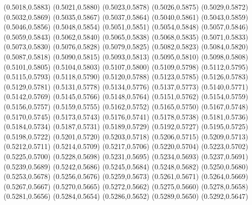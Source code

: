 \PST@Cross(0.5018,0.5883)
\PST@Cross(0.5021,0.5880)
\PST@Cross(0.5023,0.5878)
\PST@Cross(0.5026,0.5875)
\PST@Cross(0.5029,0.5872)
\PST@Cross(0.5032,0.5869)
\PST@Cross(0.5035,0.5867)
\PST@Cross(0.5037,0.5864)
\PST@Cross(0.5040,0.5861)
\PST@Cross(0.5043,0.5859)
\PST@Cross(0.5046,0.5856)
\PST@Cross(0.5048,0.5854)
\PST@Cross(0.5051,0.5851)
\PST@Cross(0.5054,0.5848)
\PST@Cross(0.5057,0.5846)
\PST@Cross(0.5059,0.5843)
\PST@Cross(0.5062,0.5840)
\PST@Cross(0.5065,0.5838)
\PST@Cross(0.5068,0.5835)
\PST@Cross(0.5071,0.5833)
\PST@Cross(0.5073,0.5830)
\PST@Cross(0.5076,0.5828)
\PST@Cross(0.5079,0.5825)
\PST@Cross(0.5082,0.5823)
\PST@Cross(0.5084,0.5820)
\PST@Cross(0.5087,0.5818)
\PST@Cross(0.5090,0.5815)
\PST@Cross(0.5093,0.5813)
\PST@Cross(0.5095,0.5810)
\PST@Cross(0.5098,0.5808)
\PST@Cross(0.5101,0.5805)
\PST@Cross(0.5104,0.5803)
\PST@Cross(0.5107,0.5800)
\PST@Cross(0.5109,0.5798)
\PST@Cross(0.5112,0.5795)
\PST@Cross(0.5115,0.5793)
\PST@Cross(0.5118,0.5790)
\PST@Cross(0.5120,0.5788)
\PST@Cross(0.5123,0.5785)
\PST@Cross(0.5126,0.5783)
\PST@Cross(0.5129,0.5781)
\PST@Cross(0.5131,0.5778)
\PST@Cross(0.5134,0.5776)
\PST@Cross(0.5137,0.5773)
\PST@Cross(0.5140,0.5771)
\PST@Cross(0.5142,0.5769)
\PST@Cross(0.5145,0.5766)
\PST@Cross(0.5148,0.5764)
\PST@Cross(0.5151,0.5762)
\PST@Cross(0.5154,0.5759)
\PST@Cross(0.5156,0.5757)
\PST@Cross(0.5159,0.5755)
\PST@Cross(0.5162,0.5752)
\PST@Cross(0.5165,0.5750)
\PST@Cross(0.5167,0.5748)
\PST@Cross(0.5170,0.5745)
\PST@Cross(0.5173,0.5743)
\PST@Cross(0.5176,0.5741)
\PST@Cross(0.5178,0.5738)
\PST@Cross(0.5181,0.5736)
\PST@Cross(0.5184,0.5734)
\PST@Cross(0.5187,0.5731)
\PST@Cross(0.5189,0.5729)
\PST@Cross(0.5192,0.5727)
\PST@Cross(0.5195,0.5725)
\PST@Cross(0.5198,0.5722)
\PST@Cross(0.5201,0.5720)
\PST@Cross(0.5203,0.5718)
\PST@Cross(0.5206,0.5715)
\PST@Cross(0.5209,0.5713)
\PST@Cross(0.5212,0.5711)
\PST@Cross(0.5214,0.5709)
\PST@Cross(0.5217,0.5706)
\PST@Cross(0.5220,0.5704)
\PST@Cross(0.5223,0.5702)
\PST@Cross(0.5225,0.5700)
\PST@Cross(0.5228,0.5698)
\PST@Cross(0.5231,0.5695)
\PST@Cross(0.5234,0.5693)
\PST@Cross(0.5237,0.5691)
\PST@Cross(0.5239,0.5689)
\PST@Cross(0.5242,0.5686)
\PST@Cross(0.5245,0.5684)
\PST@Cross(0.5248,0.5682)
\PST@Cross(0.5250,0.5680)
\PST@Cross(0.5253,0.5678)
\PST@Cross(0.5256,0.5676)
\PST@Cross(0.5259,0.5673)
\PST@Cross(0.5261,0.5671)
\PST@Cross(0.5264,0.5669)
\PST@Cross(0.5267,0.5667)
\PST@Cross(0.5270,0.5665)
\PST@Cross(0.5272,0.5662)
\PST@Cross(0.5275,0.5660)
\PST@Cross(0.5278,0.5658)
\PST@Cross(0.5281,0.5656)
\PST@Cross(0.5284,0.5654)
\PST@Cross(0.5286,0.5652)
\PST@Cross(0.5289,0.5650)
\PST@Cross(0.5292,0.5647)
